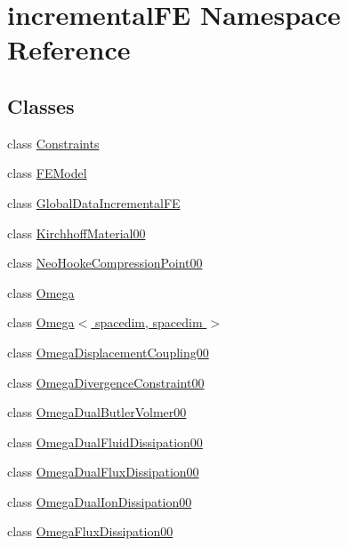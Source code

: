 \hypertarget{namespaceincremental_f_e}{}\section{incremental\+FE Namespace Reference}
\label{namespaceincremental_f_e}
\subsection*{Classes}
\begin{DoxyCompactItemize}
\item 
class \hyperlink{classincremental_f_e_1_1_constraints}{Constraints}
\item 
class \hyperlink{classincremental_f_e_1_1_f_e_model}{F\+E\+Model}
\item 
class \hyperlink{classincremental_f_e_1_1_global_data_incremental_f_e}{Global\+Data\+Incremental\+FE}
\item 
class \hyperlink{classincremental_f_e_1_1_kirchhoff_material00}{Kirchhoff\+Material00}
\item 
class \hyperlink{classincremental_f_e_1_1_neo_hooke_compression_point00}{Neo\+Hooke\+Compression\+Point00}
\item 
class \hyperlink{classincremental_f_e_1_1_omega}{Omega}
\item 
class \hyperlink{classincremental_f_e_1_1_omega_3_01spacedim_00_01spacedim_01_4}{Omega$<$ spacedim, spacedim $>$}
\item 
class \hyperlink{classincremental_f_e_1_1_omega_displacement_coupling00}{Omega\+Displacement\+Coupling00}
\item 
class \hyperlink{classincremental_f_e_1_1_omega_divergence_constraint00}{Omega\+Divergence\+Constraint00}
\item 
class \hyperlink{classincremental_f_e_1_1_omega_dual_butler_volmer00}{Omega\+Dual\+Butler\+Volmer00}
\item 
class \hyperlink{classincremental_f_e_1_1_omega_dual_fluid_dissipation00}{Omega\+Dual\+Fluid\+Dissipation00}
\item 
class \hyperlink{classincremental_f_e_1_1_omega_dual_flux_dissipation00}{Omega\+Dual\+Flux\+Dissipation00}
\item 
class \hyperlink{classincremental_f_e_1_1_omega_dual_ion_dissipation00}{Omega\+Dual\+Ion\+Dissipation00}
\item 
class \hyperlink{classincremental_f_e_1_1_omega_flux_dissipation00}{Omega\+Flux\+Dissipation00}
\item 

\end{DoxyCompactItemize}
